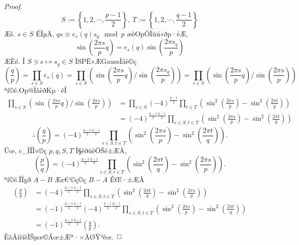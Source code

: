 \documentclass{jsarticle}
\theoremstyle{definition}
\begin{document}
\begin{proof}
\[
S:=\left\{ 1,2,\cdots,\frac{p-1}{2}\right\}
,\ T:=\left\{ 1,2,\cdots,\frac{q-1}{2}\right\}
\]
Æš­.
$s\in S$ ÉÎµÄ,
$qs\equiv e_s(q)s_{q} \mod p$ æèOpÖÌüú«ðp·éÆ,
\[
\sin\left(\frac{2\pi s}{p}q\right)
=
e_{s}(q)\sin\left(\frac{2\pi s_q }{p}\right)
\]
ÆÈé.
Î $S\ni s\longmapsto s_q\in S$ ÌSPË«ÆGaussÌâè©ç
\[
\left( \frac{q}{p}\right)=\prod_{s\in S}e_{s}(q)
=\prod_{s\in S}\left(\sin\left(\frac{2\pi s}{p}q\right)\Big/\sin\left(\frac{2\pi s_q }{p}\right)\right)
=\prod_{s\in S}\left(\sin\left(\frac{2\pi s}{p}q\right)\Big/\sin\left(\frac{2\pi s }{p}\right)\right)
\]
ªí©é.Op@ÌâèðKp·êÎ
\begin{align*}
\prod_{s\in S}\left(\sin\left(\frac{2\pi s}{p}q\right)\Big/\sin\left(\frac{2\pi s }{p}\right)\right)
&=
\prod_{s\in S}(-4)^{\frac{q-1}{2}}\prod_{t\in T}\left(\sin^2\left(\frac{2\pi s }{p}\right)-\sin^2\left(\frac{2\pi t}{q}\right)\right)
\\
&=
(-4)^{\frac{q-1}{2}\frac{p-1}{2}}\prod_{s\in S,t\in T}\left(\sin^2\left(\frac{2\pi s }{p}\right)-\sin^2\left(\frac{2\pi t}{q}\right)\right)
\end{align*}
\[
\therefore \left( \frac{q}{p}\right)=(-4)^{\frac{q-1}{2}\frac{p-1}{2}}\prod_{s\in S,t\in T}\left(\sin^2\left(\frac{2\pi s }{p}\right)-\sin^2\left(\frac{2\pi t}{q}\right)\right).
\]
Üœ, c_ÌÎÌ«©ç $p,q, S,T$ Ì§êðüêÖŠé±ÆÅ,
\[
\left( \frac{p}{q}\right)=(-4)^{\frac{p-1}{2}\frac{q-1}{2}}\prod_{s\in S,t\in T}\left(\sin^2\left(\frac{2\pi t }{q}\right)-\sin^2\left(\frac{2\pi s}{p}\right)\right).
\]
ªí©é.ÏÌgð $A-B$ Æ¢€`©ç©ç $B-A$ ÉŒ·±ÆÅ
\begin{align*}
\left( \frac{p}{q}\right)
&=
(-4)^{\frac{p-1}{2}\frac{q-1}{2}}\prod_{s\in S,t\in T}\left(\sin^2\left(\frac{2\pi t }{q}\right)-\sin^2\left(\frac{2\pi s}{p}\right)\right)
\\&=
(-1)^{\frac{p-1}{2}\frac{q-1}{2}}(-4)^{\frac{q-1}{2}\frac{p-1}{2}}\prod_{s\in S,t\in T}\left(\sin^2\left(\frac{2\pi s }{p}\right)-\sin^2\left(\frac{2\pi t}{q}\right)\right)
\\&=
(-1)^{\frac{p-1}{2}\frac{q-1}{2}}\left( \frac{q}{p} \right).
\end{align*}
ÈãÅíêíêÌŠµœ©Áœ±Æª·×ÄØŸ³êœ.
\end{proof}
\end{document}
